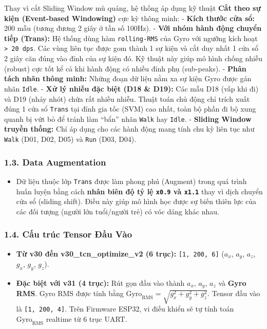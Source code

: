 \documentclass[12pt,a4paper]{article}
\providecommand{\tightlist}{\setlength{\itemsep}{0pt}\setlength{\parskip}{0pt}}
\begin{document}
Thay vì cắt Sliding Window mù quáng, hệ thống áp dụng kỹ thuật
\textbf{Cắt theo sự kiện (Event-based Windowing)} cực kỳ thông minh: -
\textbf{Kích thước cửa sổ:} 200 mẫu (tương đương 2 giây ở tần số 100Hz).
- \textbf{Với nhóm hành động chuyển tiếp (Trans):} Hệ thống dùng hàm
\texttt{rolling-RMS} của Gyro với ngưỡng kích hoạt
\texttt{\textgreater{}\ 20\ dps}. Các vùng liên tục được gom thành 1 sự
kiện và cắt duy nhất 1 cửa sổ 2 giây căn đúng vào đỉnh của sự kiện đó.
Kỹ thuật này giúp mô hình chống nhiễu (robust) cực tốt kể cả khi hành
động có nhiều đỉnh phụ (sub-peaks). - \textbf{Phân tách nhãn thông
minh:} Những đoạn dữ liệu nằm xa sự kiện Gyro được gán nhãn
\texttt{Idle}. - \textbf{Xử lý nhiễu đặc biệt (D18 \& D19):} Các mẫu D18
(vấp khi đi) và D19 (nhảy nhót) chứa rất nhiều nhiễu. Thuật toán chủ
động chỉ trích xuất đúng 1 cửa sổ \texttt{Trans} tại đỉnh gia tốc (SVM)
cao nhất, toàn bộ phần đi bộ xung quanh bị vứt bỏ để tránh làm ``bẩn''
nhãn \texttt{Walk} hay \texttt{Idle}. - \textbf{Sliding Window truyền
thống:} Chỉ áp dụng cho các hành động mang tính chu kỳ liên tục như
\texttt{Walk} (D01, D02, D05) và \texttt{Run} (D03, D04).

\subsubsection{1.3. Data Augmentation}\label{data-augmentation}

\begin{itemize}
\tightlist
\item
  Dữ liệu thuộc lớp \texttt{Trans} được làm phong phú (Augment) trong
  quá trình huấn luyện bằng cách \textbf{nhân biên độ tỷ lệ
  \texttt{x0.9} và \texttt{x1.1}} thay vì dịch chuyển cửa sổ (sliding
  shift). Điều này giúp mô hình học được sự biến thiên lực của các đối
  tượng (người lớn tuổi/người trẻ) có vóc dáng khác nhau.
\end{itemize}

\subsubsection{1.4. Cấu trúc Tensor Đầu
Vào}\label{cux1ea5u-truxfac-tensor-ux111ux1ea7u-vuxe0o}

\begin{itemize}
\tightlist
\item
  \textbf{Từ v30 đến v30\_tcn\_optimize\_v2 (6 trục):}
  \texttt{{[}1,\ 200,\ 6{]}} (\(a_x\), \(a_y\), \(a_z\), \(g_x\),
  \(g_y\), \(g_z\)).
\item
  \textbf{Đặc biệt với v31 (4 trục):} Rút gọn đầu vào thành \(a_x\),
  \(a_y\), \(a_z\) và \textbf{Gyro RMS}. Gyro RMS được tính bằng
  \(\text{Gyro}_{\text{RMS}} = \sqrt{g_x^2 + g_y^2 + g_z^2}\). Tensor
  đầu vào là \texttt{{[}1,\ 200,\ 4{]}}. Trên Firmware ESP32, vi điều
  khiển sẽ tự tính toán \(\text{Gyro}_{\text{RMS}}\) realtime từ 6 trục
  UART.
\end{itemize}
\end{document}
